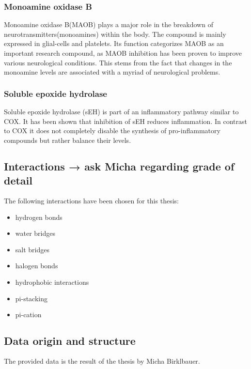 \subsubsection*{Monoamine oxidase B}
Monoamine oxidase B(MAOB) plays a major role in the breakdown of neurotransmitters(monoamines) within the body.
The compound is mainly expressed in glial-cells and platelets.
Its function categorizes MAOB as an important research compound, as MAOB inhibition has been proven to improve 
various neurological conditions. This stems from the fact that changes in the monoamine levels are
associated with a myriad of neurological problems\cite[]{Ramsay2016}.
\subsubsection*{Soluble epoxide hydrolase}
Soluble epoxide hydrolase (sEH) is part of an inflammatory pathway similar to COX.
It has been shown that inhibition of sEH reduces inflammation. In contrast to COX it does not 
completely disable the synthesis of pro-inflammatory compounds but rather balance their levels\cite[]{Schmelzer2005}.
\subsection{Interactions → ask Micha regarding grade of detail}
The following interactions have been chosen for this thesis:
\begin{itemize}
    \item hydrogen bonds
    \item water bridges
    \item salt bridges
    \item halogen bonds
    \item hydrophobic interactions
    \item pi-stacking
    \item pi-cation
\end{itemize}
\cite[]{Birklbauer2021}
\subsection{Data origin and structure}
The provided data is the result of the thesis \cite[]{Birklbauer2021} by Micha Birklbauer.
 